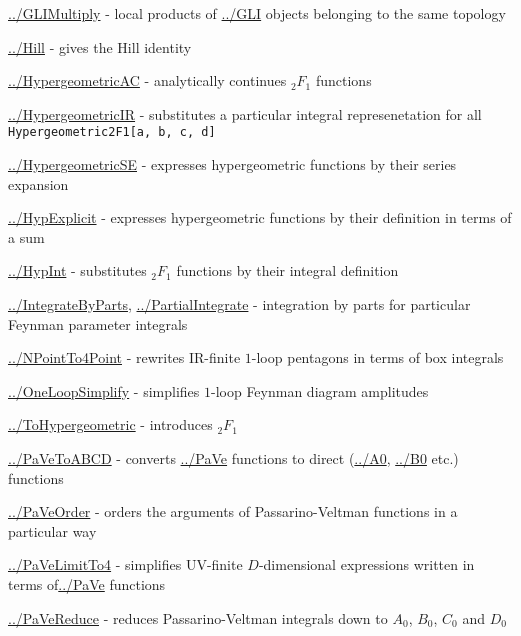 \documentclass[../FeynCalcManual.tex]{subfiles}
\begin{document}
\begin{itemize}
{\item
  \hyperlink{../glimultiply}{../GLIMultiply} - local products of
  \hyperlink{../gli}{../GLI} objects belonging to the same topology
\item
  \hyperlink{../hill}{../Hill} - gives the Hill identity
\item
  \hyperlink{../hypergeometricac}{../HypergeometricAC} - analytically
  continues \({}_2 F_1\) functions
\item
  \hyperlink{../hypergeometricir}{../HypergeometricIR} - substitutes a
  particular integral represenetation for all
  \texttt{Hypergeometric2F1[\allowbreak{}a,\ \allowbreak{}b,\ \allowbreak{}c,\ \allowbreak{}d]}
\item
  \hyperlink{../hypergeometricse}{../HypergeometricSE} - expresses
  hypergeometric functions by their series expansion
\item
  \hyperlink{../hypexplicit}{../HypExplicit} - expresses hypergeometric
  functions by their definition in terms of a sum
\item
  \hyperlink{../hypint}{../HypInt} - substitutes \({}_2 F_1\) functions
  by their integral definition
\item
  \hyperlink{../integratebyparts}{../IntegrateByParts},
  \hyperlink{../partialintegrate}{../PartialIntegrate} - integration by
  parts for particular Feynman parameter integrals
\item
  \hyperlink{../npointto4point}{../NPointTo4Point} - rewrites IR-finite
  \(1\)-loop pentagons in terms of box integrals
\item
  \hyperlink{../oneloopsimplify}{../OneLoopSimplify} - simplifies
  \(1\)-loop Feynman diagram amplitudes
\item
  \hyperlink{../tohypergeometric}{../ToHypergeometric} - introduces
  \({}_2 F_1\)
\item
  \hyperlink{../pavetoabcd}{../PaVeToABCD} - converts
  \hyperlink{../pave}{../PaVe} functions to direct
  (\hyperlink{../a0}{../A0}, \hyperlink{../b0}{../B0} etc.) functions
\item
  \hyperlink{../paveorder}{../PaVeOrder} - orders the arguments of
  Passarino-Veltman functions in a particular way
\item
  \hyperlink{../pavelimitto4}{../PaVeLimitTo4} - simplifies UV-finite
  \(D\)-dimensional expressions written in terms
  of\hyperlink{../pave}{../PaVe} functions
\item
  \hyperlink{../pavereduce}{../PaVeReduce} - reduces Passarino-Veltman
  integrals down to \(A_0\), \(B_0\), \(C_0\) and \(D_0\)
}
\end{itemize}
\end{document}
